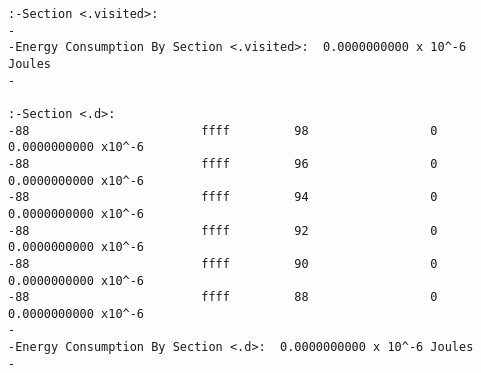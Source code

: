\begin{verbatim}
:-Section <.visited>:  
-                                                                                          
-Energy Consumption By Section <.visited>:  0.0000000000 x 10^-6 Joules
-                                                                                          

:-Section <.d>:  
-88                        ffff         98                 0              0.0000000000 x10^-6 
-88                        ffff         96                 0              0.0000000000 x10^-6 
-88                        ffff         94                 0              0.0000000000 x10^-6 
-88                        ffff         92                 0              0.0000000000 x10^-6 
-88                        ffff         90                 0              0.0000000000 x10^-6 
-88                        ffff         88                 0              0.0000000000 x10^-6 
-                                                                                          
-Energy Consumption By Section <.d>:  0.0000000000 x 10^-6 Joules
-                                                                                          


\end{verbatim}
